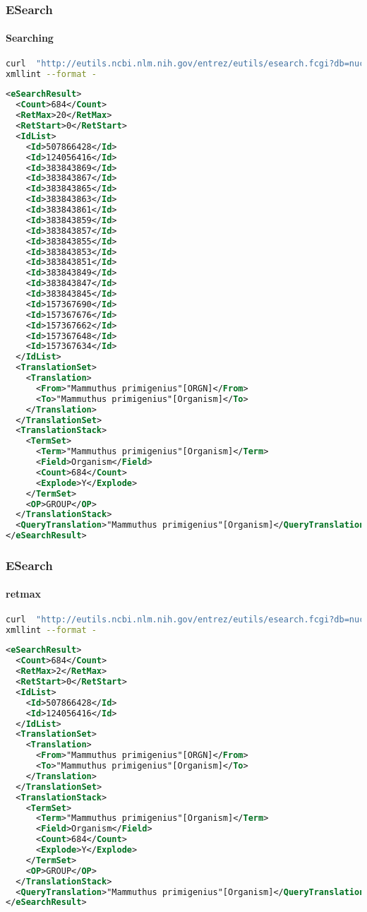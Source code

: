 \documentclass{beamer}
\begin{document}
\begin{frame}[fragile]
\frametitle{ESearch}
\framesubtitle{Searching }
\begin{lstlisting}[language=bash,basicstyle=\tiny,breaklines=true]
curl  "http://eutils.ncbi.nlm.nih.gov/entrez/eutils/esearch.fcgi?db=nucleotide&term=%22Mammuthus%20primigenius%22%5BORGN%5D" |\
xmllint --format -
\end{lstlisting}

\begin{lstlisting}[language=xml,basicstyle=\tiny,breaklines=false]
<eSearchResult>
  <Count>684</Count>
  <RetMax>20</RetMax>
  <RetStart>0</RetStart>
  <IdList>
    <Id>507866428</Id>
    <Id>124056416</Id>
    <Id>383843869</Id>
    <Id>383843867</Id>
    <Id>383843865</Id>
    <Id>383843863</Id>
    <Id>383843861</Id>
    <Id>383843859</Id>
    <Id>383843857</Id>
    <Id>383843855</Id>
    <Id>383843853</Id>
    <Id>383843851</Id>
    <Id>383843849</Id>
    <Id>383843847</Id>
    <Id>383843845</Id>
    <Id>157367690</Id>
    <Id>157367676</Id>
    <Id>157367662</Id>
    <Id>157367648</Id>
    <Id>157367634</Id>
  </IdList>
  <TranslationSet>
    <Translation>
      <From>"Mammuthus primigenius"[ORGN]</From>
      <To>"Mammuthus primigenius"[Organism]</To>
    </Translation>
  </TranslationSet>
  <TranslationStack>
    <TermSet>
      <Term>"Mammuthus primigenius"[Organism]</Term>
      <Field>Organism</Field>
      <Count>684</Count>
      <Explode>Y</Explode>
    </TermSet>
    <OP>GROUP</OP>
  </TranslationStack>
  <QueryTranslation>"Mammuthus primigenius"[Organism]</QueryTranslation>
</eSearchResult>
\end{lstlisting}
\end{frame}

\begin{frame}[fragile]
\frametitle{ESearch}
\framesubtitle{retmax  }
\begin{lstlisting}[language=bash,basicstyle=\tiny,breaklines=true]
curl  "http://eutils.ncbi.nlm.nih.gov/entrez/eutils/esearch.fcgi?db=nucleotide&term=%22Mammuthus%20primigenius%22%5BORGN%5D&retmax=2" |\
xmllint --format -
\end{lstlisting}

\begin{lstlisting}[language=xml,basicstyle=\tiny,breaklines=false]
<eSearchResult>
  <Count>684</Count>
  <RetMax>2</RetMax>
  <RetStart>0</RetStart>
  <IdList>
    <Id>507866428</Id>
    <Id>124056416</Id>
  </IdList>
  <TranslationSet>
    <Translation>
      <From>"Mammuthus primigenius"[ORGN]</From>
      <To>"Mammuthus primigenius"[Organism]</To>
    </Translation>
  </TranslationSet>
  <TranslationStack>
    <TermSet>
      <Term>"Mammuthus primigenius"[Organism]</Term>
      <Field>Organism</Field>
      <Count>684</Count>
      <Explode>Y</Explode>
    </TermSet>
    <OP>GROUP</OP>
  </TranslationStack>
  <QueryTranslation>"Mammuthus primigenius"[Organism]</QueryTranslation>
</eSearchResult>
\end{lstlisting}
\end{frame}
\end{document}
